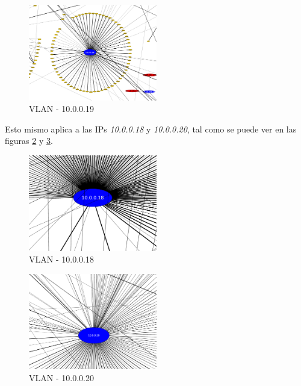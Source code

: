 \begin{figure}[!ht]
    \centering
    \includegraphics[width=0.5\textwidth]{img/graph/escenario_1/vlan1/vlan1_1000toEnd_10_0_0_19}
    \caption{VLAN  - 10.0.0.19}
    \label{fig:vlan1_grafo_10_0_0_19}
\end{figure}

\par Esto mismo aplica a las IPs \textit{10.0.0.18} y \textit{10.0.0.20}, tal como se puede ver
en las figuras \ref{fig:vlan1_grafo_10_0_0_18} y \ref{fig:vlan1_grafo_10_0_0_20}.

\begin{figure}[!ht]
    \centering
    \includegraphics[width=0.5\textwidth]{img/graph/escenario_1/vlan1/vlan1_1000toEnd_10_0_0_18}
    \caption{VLAN  - 10.0.0.18}
    \label{fig:vlan1_grafo_10_0_0_18}
\end{figure}

\begin{figure}[!ht]
    \centering
    \includegraphics[width=0.5\textwidth]{img/graph/escenario_1/vlan1/vlan1_1000toEnd_10_0_0_20}
    \caption{VLAN  - 10.0.0.20}
    \label{fig:vlan1_grafo_10_0_0_20}
\end{figure}

